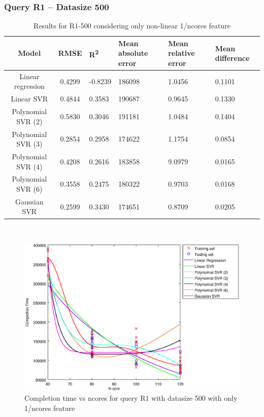 \documentclass[a4paper,11pt]{article}
\begin{document}
\newpage
\subsubsection{Query R1 -- Datasize 500}
\begin{table}[H]
	\centering
	\begin{adjustbox}{center}
		\begin{tabular}{c | c M{1.2cm} M{2.5cm} M{2.5cm} M{1.8cm}}
			Model & RMSE & R\textsuperscript{2} & Mean absolute error & Mean relative error & Mean difference \tabularnewline
			\hline
			Linear regression & 0.4299 & -0.8239 & 186098 & 1.0456 & 0.1101 \\
			Linear SVR & 0.4844 & 0.3583 & 190687 & 0.9645 & 0.1330 \\
			Polynomial SVR (2) & 0.5830 & 0.3046 & 191181 & 1.0484 & 0.1404 \\
			Polynomial SVR (3) & 0.2854 & 0.2958 & 174622 & 1.1754 & 0.0854 \\
			Polynomial SVR (4) & 0.4208 & 0.2616 & 183858 & 9.0979 & 0.0165 \\
			Polynomial SVR (6) & 0.3558 & 0.2475 & 180322 & 0.9703 & 0.0168 \\
			Gaussian SVR & 0.2599 & 0.3430 & 174651 & 0.8709 & 0.0205 \\
		\end{tabular}
	\end{adjustbox}
	\\
	\caption{Results for R1-500 considering only non-linear 1/ncores feature}
	\label{table_R1_prediction_all}
\end{table}

\begin {figure}[hbtp]
\centering
\includegraphics[width=\textwidth]{output/R1_500_ONLY_1_OVER_NCORES/plot_R1_500.eps}
\caption {Completion time vs ncores for query R1 with datasize 500 with only 1/ncores feature}
\end {figure}
\end{document}
